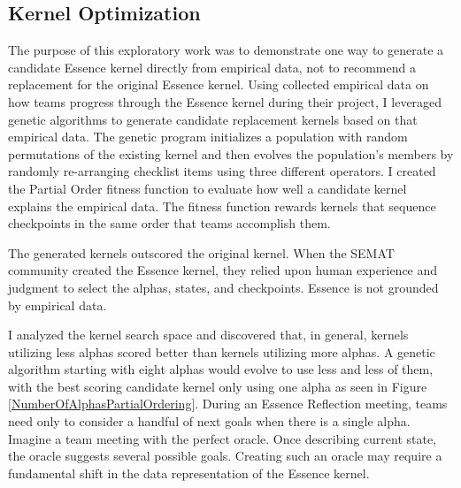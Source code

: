\documentclass[preprint,12pt,3p]{elsarticle}
\begin{document}
\subsection{Kernel Optimization}
\label{KernelOptimization}
The purpose of this exploratory work was to demonstrate one way to generate a candidate Essence kernel directly from empirical data, not to recommend a replacement for the original Essence kernel. \cite{SCSE2015} 
Using collected empirical data on how teams progress through the Essence kernel during their project, I leveraged genetic algorithms to generate candidate replacement kernels based on that empirical data. 
The genetic program initializes a population with random permutations of the existing kernel and then evolves the population's members by randomly re-arranging checklist items using three different operators. I created the Partial Order fitness function to evaluate how well a candidate kernel explains the empirical data. The fitness function rewards kernels that sequence checkpoints in the same order that teams accomplish them. 


The generated kernels outscored the original kernel. When the SEMAT community created the Essence kernel, they relied upon human experience and judgment to select the alphas, states, and checkpoints. Essence is not grounded by empirical data. 

I analyzed the kernel search space and discovered that, in general, kernels utilizing less alphas scored better than kernels utilizing more alphas. A genetic algorithm starting with eight alphas would evolve to use less and less of them, with the best scoring candidate kernel only using one alpha as seen in Figure \ref{NumberOfAlphasPartialOrdering}. During an Essence Reflection meeting, teams need only to consider a handful of next goals when there is a single alpha. Imagine a team meeting with the perfect oracle. Once describing current state, the oracle suggests several possible goals. Creating such an oracle may require a fundamental shift in the data representation of the Essence kernel. 
\end{document}
